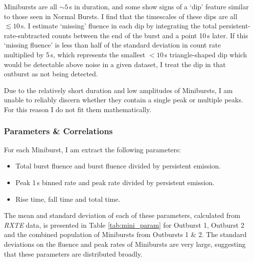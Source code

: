 \par Minibursts are all $\sim5$\,s in duration, and some show signs of a `dip' feature similar to those seen in Normal Bursts.  I find that the timescales of these dips are all $\lesssim10$\,s.  I estimate `missing' fluence in each dip by integrating the total persistent-rate-subtracted counts between the end of the burst and a point 10\,s later.  If this `missing fluence' is less than half of the standard deviation in count rate multiplied by 5\,s, which represents the smallest $<10$\,s triangle-shaped dip which would be detectable above noise in a given dataset, I treat the dip in that outburst as not being detected.
\par Due to the relatively short duration and low amplitudes of Minibursts, I am unable to reliably discern whether they contain a single peak or multiple peaks.  For this reason I do not fit them mathematically.

\subsubsection{Parameters \& Correlations}

\label{sec:ministruc}

\par For each Miniburst, I am extract the following parameters:

\begin{itemize}
\item Total burst fluence and burst fluence divided by persistent emission.
\item Peak 1\,s binned rate and peak rate divided by persistent emission.
\item Rise time, fall time and total time.
\end{itemize}
The mean and standard deviation of each of these parameters, calculated from \textit{RXTE} data, is presented in Table \ref{tab:mini_param} for Outburst 1, Outburst 2 and the combined population of Minibursts from Outbursts 1 \& 2.  The standard deviations on the fluence and peak rates of Minibursts are very large, suggesting that these parameters are distributed broadly.

